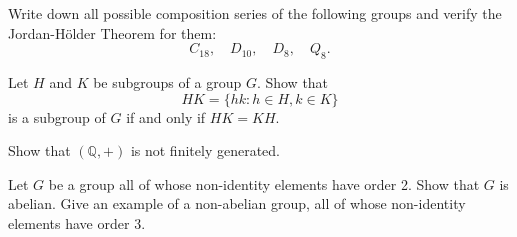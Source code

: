 \documentclass[answers]{exam}
\begin{document}
\begin{questions}
\question%
Write down all possible composition series of the following groups and verify the Jordan-Hölder Theorem for them: \[
	C_{18}, \quad D_{10}, \quad D_8, \quad Q_8.
\]



\question%
Let $H$ and $K$ be subgroups of a group $G$. Show that \[
	H K=\{h k: h \in H, k \in K\}
\] is a subgroup of $G$ if and only if $H K=K H$.


\question%
Show that $(\mathbb{Q},+)$ is not finitely generated.



\question%
Let $G$ be a group all of whose non-identity elements have order 2. Show that $G$ is abelian. Give an example of a non-abelian group, all of whose non-identity elements have order 3.

\end{questions}
\end{document}
